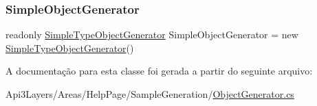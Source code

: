 \subsubsection{\texorpdfstring{Simple\+Object\+Generator}{SimpleObjectGenerator}}
{\footnotesize\ttfamily readonly \hyperlink{classApi3Layers_1_1Areas_1_1HelpPage_1_1ObjectGenerator_1_1SimpleTypeObjectGenerator}{Simple\+Type\+Object\+Generator} Simple\+Object\+Generator = new \hyperlink{classApi3Layers_1_1Areas_1_1HelpPage_1_1ObjectGenerator_1_1SimpleTypeObjectGenerator}{Simple\+Type\+Object\+Generator}()\hspace{0.3cm}{\ttfamily [private]}}



A documentação para esta classe foi gerada a partir do seguinte arquivo\+:\begin{DoxyCompactItemize}
\item 
Api3\+Layers/\+Areas/\+Help\+Page/\+Sample\+Generation/\hyperlink{ObjectGenerator_8cs}{Object\+Generator.\+cs}\end{DoxyCompactItemize}
